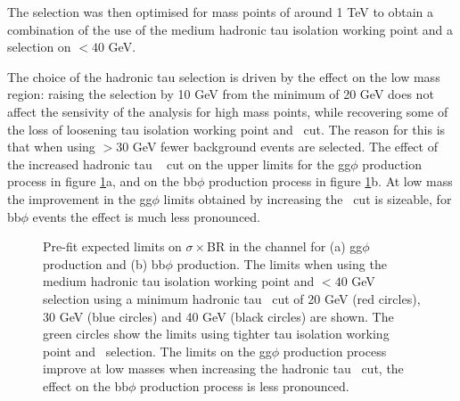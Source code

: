 The selection was then optimised for mass points of around 1 TeV to obtain a combination
of the use of the medium hadronic tau isolation working point and a selection on \mT$<40$ GeV.

The choice of the hadronic tau \pT selection is driven by the effect on the low mass region:
raising the \pT selection by 10 GeV from the minimum of 20 GeV does not affect the sensivity
of the analysis for high mass points, while recovering some of the loss of loosening 
tau isolation working point and \mT~cut. The reason for this is that when using \pT$>30$ GeV 
fewer background events are selected. The effect of the increased hadronic tau \pT~ cut on the 
upper limits for the gg$\phi$ production process
in figure \ref{fig:mssm_tauptcut}a, and on the bb$\phi$ production process
in figure \ref{fig:mssm_tauptcut}b. At low mass the improvement in the gg$\phi$ limits
obtained by increasing the \pT~cut is sizeable, for bb$\phi$ events the effect is much
less pronounced.

\begin{figure}[h!]
\begin{center}
\end{center}
\caption{Pre-fit expected limits on $\sigma\times$BR in the \mutau channel for (a) gg$\phi$ production and (b) bb$\phi$ production. The
limits when using the medium hadronic tau isolation working point and \mT$<40$ GeV selection using a minimum
hadronic tau \pT~cut of 20 GeV (red circles), 30 GeV (blue circles) and 40 GeV (black circles) are shown. The green
circles show the limits using tighter tau isolation working point and \mT~selection. The limits on
the gg$\phi$ production process improve at low masses when increasing the hadronic tau \pT~cut,
the effect on the bb$\phi$ production process is less pronounced.}
\label{fig:mssm_tauptcut}
\end{figure}


